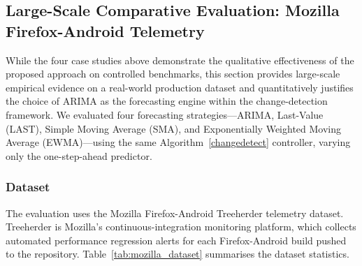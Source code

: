 \documentclass[pdflatex,sn-nature]{sn-jnl}%
\theoremstyle{thmstyleone}%
\theoremstyle{thmstyletwo}%
\theoremstyle{thmstylethree}%
\begin{document}


\subsection{Large-Scale Comparative Evaluation: Mozilla Firefox-Android Telemetry}\label{sec:mozilla_comparison}

While the four case studies above demonstrate the qualitative effectiveness of the proposed approach on controlled benchmarks, this section provides large-scale empirical evidence on a real-world production dataset and quantitatively justifies the choice of ARIMA as the forecasting engine within the change-detection framework. We evaluated four forecasting strategies---ARIMA, Last-Value (LAST), Simple Moving Average (SMA), and Exponentially Weighted Moving Average (EWMA)---using the same Algorithm~\ref{changedetect} controller, varying only the one-step-ahead predictor.

\subsubsection{Dataset}
The evaluation uses the Mozilla Firefox-Android Treeherder telemetry dataset. Treeherder is Mozilla's continuous-integration monitoring platform, which collects automated performance regression alerts for each Firefox-Android build pushed to the repository. Table~\ref{tab:mozilla_dataset} summarises the dataset statistics.
\end{document}
